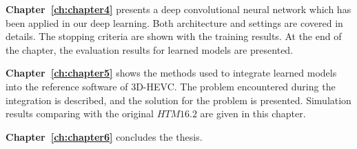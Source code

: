 \textbf{Chapter~\ref{ch:chapter4}} presents a deep convolutional
neural network which has been applied in our deep learning.
Both architecture and settings
are covered in details.
The stopping criteria are shown with the training results.
At the end of the chapter, the evaluation results for learned models
are presented.

\textbf{Chapter~\ref{ch:chapter5}} 
shows the methods
used to integrate learned models
into the reference software of 3D-HEVC\@.
The problem encountered during the integration is described,
and the solution for the problem is presented.
Simulation results comparing with the original \(HTM16.2\) are given in this
chapter.

\textbf{Chapter~\ref{ch:chapter6}} concludes the thesis.
